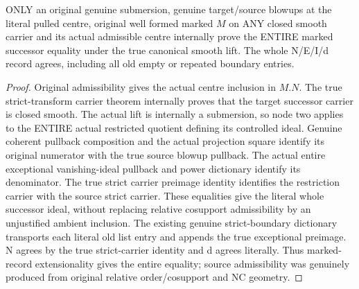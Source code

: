 \begin{theorem}
\label{hir:submersion-relative-control-entire-marked-step}
\leanok
ONLY an original genuine submersion, genuine target/source blowups at the
literal pulled centre, original well formed marked $M$ on ANY closed smooth
carrier and its actual admissible centre internally prove the ENTIRE marked
successor equality under the true canonical smooth lift. The whole N/E/I/d
record agrees, including all old empty or repeated boundary entries.
\end{theorem}
\begin{proof}
Original admissibility gives the actual centre inclusion in $M.N$. The true
strict-transform carrier theorem internally proves that the target successor
carrier is closed smooth. The actual lift is internally a submersion, so
node two applies to the ENTIRE actual restricted quotient defining its
controlled ideal. Genuine coherent pullback composition and the actual
projection square identify its original numerator with the true source
blowup pullback. The actual entire exceptional vanishing-ideal pullback and
power dictionary identify its denominator. The true strict carrier preimage
identity identifies the restriction carrier with the source strict carrier.
These equalities give the literal whole successor ideal, without replacing
relative cosupport admissibility by an unjustified ambient inclusion.
The existing genuine strict-boundary dictionary transports each literal old
list entry and appends the true exceptional preimage. N agrees by the true
strict-carrier identity and d agrees literally. Thus marked-record
extensionality gives the entire equality; source admissibility was genuinely
produced from original relative order/cosupport and NC geometry.
\end{proof}

